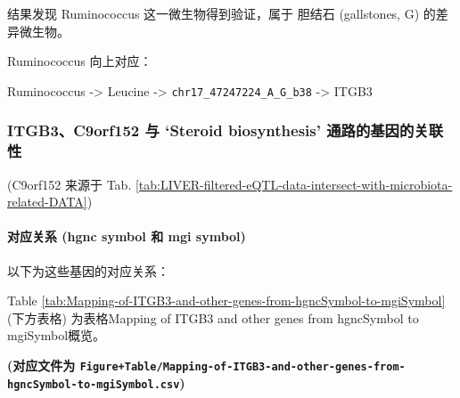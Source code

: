 \documentclass[
]{article}
\begin{document}
结果发现 Ruminococcus 这一微生物得到验证，属于 胆结石 (gallstones, G) 的差异微生物。

Ruminococcus 向上对应：

Ruminococcus -\textgreater{} Leucine -\textgreater{} \texttt{chr17\_47247224\_A\_G\_b38} -\textgreater{} ITGB3

\hypertarget{itgb3c9orf152-ux4e0e-steroid-biosynthesis-ux901aux8defux7684ux57faux56e0ux7684ux5173ux8054ux6027}{%
\subsubsection{ITGB3、C9orf152 与 `Steroid biosynthesis' 通路的基因的关联性}\label{itgb3c9orf152-ux4e0e-steroid-biosynthesis-ux901aux8defux7684ux57faux56e0ux7684ux5173ux8054ux6027}}

(C9orf152 来源于 Tab. \ref{tab:LIVER-filtered-eQTL-data-intersect-with-microbiota-related-DATA})

\hypertarget{ux5bf9ux5e94ux5173ux7cfb-hgnc-symbol-ux548c-mgi-symbol}{%
\paragraph{对应关系 (hgnc symbol 和 mgi symbol)}\label{ux5bf9ux5e94ux5173ux7cfb-hgnc-symbol-ux548c-mgi-symbol}}

以下为这些基因的对应关系：

Table \ref{tab:Mapping-of-ITGB3-and-other-genes-from-hgncSymbol-to-mgiSymbol} (下方表格) 为表格Mapping of ITGB3 and other genes from hgncSymbol to mgiSymbol概览。

\textbf{(对应文件为 \texttt{Figure+Table/Mapping-of-ITGB3-and-other-genes-from-hgncSymbol-to-mgiSymbol.csv})}
\end{document}
